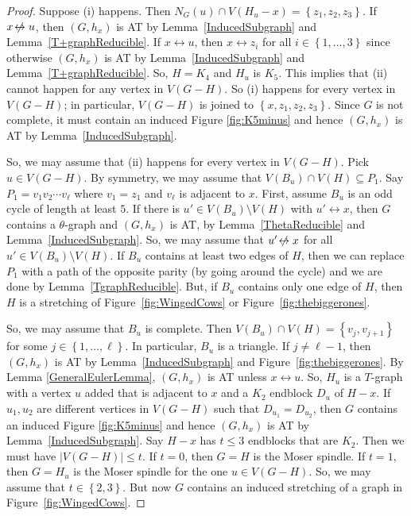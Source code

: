 \documentclass[12pt]{article}
\theoremstyle{plain}
\theoremstyle{definition}
\theoremstyle{remark}
\newcommand{\set}[1]{\left\{ #1 \right\}}
\newcommand{\irange}[1]{\left\{1,\ldots,#1\right\}}
\def\adj{\leftrightarrow}
\def\nonadj{\not\!\leftrightarrow}
\begin{document}
\begin{proof}
	Suppose (i) happens. Then $N_G(u) \cap V(H_u - x) = \set{z_1,z_2,z_3}$. If $x \nonadj u$, then $(G,h_x)$ is AT by Lemma~\ref{InducedSubgraph} and Lemma~\ref{T+graphReducible}.
	If $x \adj u$, then $x \adj z_i$ for all $i \in \irange{3}$ since otherwise $(G,h_x)$ is AT by Lemma~\ref{InducedSubgraph} and Lemma~\ref{T+graphReducible}.  So, $H=K_4$ and $H_u$ is $K_5$.  
	This implies that (ii) cannot happen for any vertex in $V(G-H)$. So (i) happens for every vertex in $V(G-H)$; in particular, $V(G-H)$ is joined to $\set{x,z_1,z_2,z_3}$.  Since $G$ is not complete, it must contain an induced Figure \ref{fig:K5minus} and hence $(G,h_x)$ is AT by Lemma~\ref{InducedSubgraph}.
		
	So, we may assume that (ii) happens for every vertex in $V(G-H)$. Pick $u \in V(G - H)$. By symmetry, we may assume that $V(B_u) \cap V(H) \subseteq P_1$.
	Say $P_1 = v_1v_2\cdots v_{\ell}$ where $v_1 = z_1$ and $v_{\ell}$ is adjacent to $x$.	First, assume $B_u$ is an odd cycle of length at least $5$.  If there is $u' \in V(B_u)\setminus V(H)$ with $u' \adj x$, then $G$ contains a $\theta$-graph and  $(G,h_x)$ is AT, by	Lemma~\ref{ThetaReducible} and Lemma~\ref{InducedSubgraph}.  So, we may assume that $u' \nonadj x$ for all $u' \in V(B_u)\setminus V(H)$.  If $B_u$ contains at least two edges of $H$, then we can replace $P_1$ with a path of the opposite parity (by going around the cycle) and we are done by Lemma~\ref{TgraphReducible}.  But, if $B_u$ contains only one edge of $H$, then $H$ is a stretching of Figure~\ref{fig:WingedCows} or Figure~\ref{fig:thebiggerones}.
	
	So, we may assume that $B_u$ is complete. Then $V(B_u) \cap V(H) = \set{v_{j}, v_{j+1}}$ for some $j \in \irange{\ell}$.  
	In particular, $B_u$ is a triangle.  If $j \ne \ell - 1$, then $(G,h_x)$ is AT by Lemma~\ref{InducedSubgraph} and Figure~\ref{fig:thebiggerones}. 	By Lemma \ref{GeneralEulerLemma}, $(G,h_x)$ is AT unless $x \adj u$.  
	So, $H_u$ is a $T$-graph with a vertex $u$ added that is adjacent to $x$ and a $K_2$ endblock $D_u$ of $H-x$.  If $u_1, u_2$ are different vertices in $V(G-H)$ such that $D_{u_1} = D_{u_2}$, then $G$ contains an induced Figure \ref{fig:K5minus} and hence $(G,h_x)$ is AT by Lemma~\ref{InducedSubgraph}. Say $H-x$ has $t \le 3$ endblocks that are $K_2$. Then we must have $|V(G - H)| \le t$.   If $t = 0$, then $G = H$ is the Moser spindle.  If $t=1$, then $G = H_u$ is the Moser spindle for the one $u \in V(G-H)$.  So, we may assume that $t \in \set{2,3}$.    But now $G$ contains an induced stretching of a graph in Figure~\ref{fig:WingedCows}.
	
\end{proof}
\end{document}
